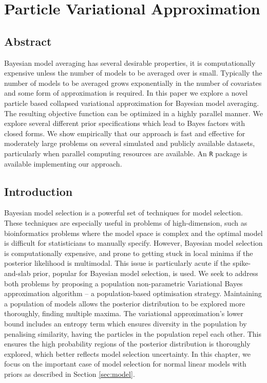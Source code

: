 \chapter{Particle Variational Approximation}


\section*{Abstract}

Bayesian model averaging  has several desirable properties, it is computationally expensive unless 
the number of models to be averaged  over is small. Typically the number of models to be averaged
grows exponentially in the number of covariates and some form of approximation is required. 
In this paper we explore a novel particle based  collapsed variational approximation 
for Bayesian model averaging. 
The resulting objective function can be optimized in a highly
parallel manner.
We explore several different prior
specifications which lead to Bayes factors with closed forms. 
We show empirically that our approach
is fast and effective for moderately large problems  on several simulated and publicly available 
datasets, particularly when parallel computing resources are available. An {\tt R} package is available implementing our approach.

\newpage 

\section{Introduction}

Bayesian model selection is a powerful set of techniques for model selection.
These techniques are especially useful in problems of high-dimension, such as
bioinformatics problems where the model space is complex and the optimal model
is difficult for statisticians to manually specify. However, Bayesian model
selection is computationally expensive, and prone to getting stuck in local
minima if the posterior likelihood is multimodal. This issue is particularly
acute if the spike-and-slab prior, popular for Bayesian model selection, is
used. We seek to address both problems by proposing a population non-parametric
Variational Bayes approximation algorithm -- a population-based optimisation
strategy. Maintaining a population of models allows the posterior distribution
to be explored more thoroughly, finding multiple maxima. The variational
approximation's lower bound includes an entropy term which ensures diversity in
the population by penalising similarity,  having the particles in the
population repel each other. This ensures the high probability regions of the
posterior distribution is thoroughly explored, which better reflects model
selection uncertainty. In this chapter, we focus on the important case of model
selection for normal linear models with priors as described in Section
\ref{sec:model}.


